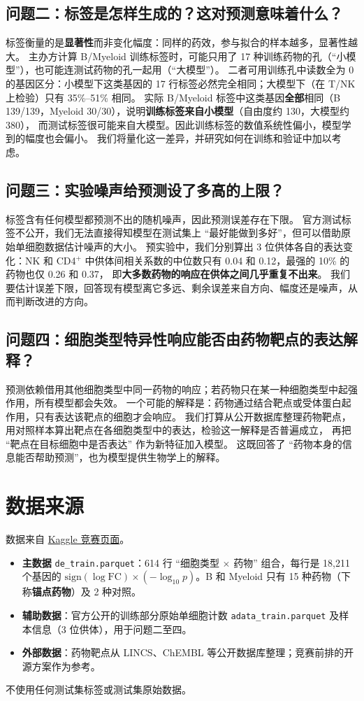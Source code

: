 \documentclass[11pt,a4paper]{article}
\begin{document}
\subsection*{问题二：标签是怎样生成的？这对预测意味着什么？}
标签衡量的是\textbf{显著性}而非变化幅度：同样的药效，参与拟合的样本越多，显著性越大。
主办方计算 B/Myeloid 训练标签时，可能只用了 17 种训练药物的孔（``小模型''），也可能连测试药物的孔一起用（``大模型''）。
二者可用训练孔中读数全为 0 的基因区分：小模型下这类基因的 17 行标签必然完全相同；大模型下（在 T/NK 上检验）只有 35\%--51\% 相同。
实际 B/Myeloid 标签中这类基因\textbf{全部}相同（B 139/139，Myeloid 30/30），说明\textbf{训练标签来自小模型}（自由度约 130，大模型约 380），
而测试标签很可能来自大模型。因此训练标签的数值系统性偏小，模型学到的幅度也会偏小。
我们将量化这一差异，并研究如何在训练和验证中加以考虑。

\subsection*{问题三：实验噪声给预测设了多高的上限？}
标签含有任何模型都预测不出的随机噪声，因此预测误差存在下限。
官方测试标签不公开，我们无法直接得知模型在测试集上 ``最好能做到多好''，但可以借助原始单细胞数据估计噪声的大小。
预实验中，我们分别算出 3 位供体各自的表达变化：NK 和 CD4$^+$ 中供体间相关系数的中位数只有 0.04 和 0.12，最强的 10\% 的药物也仅 0.26 和 0.37，
即\textbf{大多数药物的响应在供体之间几乎重复不出来}。
我们要估计误差下限，回答现有模型离它多远、剩余误差来自方向、幅度还是噪声，从而判断改进的方向。

\subsection*{问题四：细胞类型特异性响应能否由药物靶点的表达解释？}
预测依赖借用其他细胞类型中同一药物的响应；若药物只在某一种细胞类型中起强作用，所有模型都会失效。
一个可能的解释是：药物通过结合靶点或受体蛋白起作用，只有表达该靶点的细胞才会响应。
我们打算从公开数据库整理药物靶点，用对照样本算出靶点在各细胞类型中的表达，检验这一解释是否普遍成立，
再把 ``靶点在目标细胞中是否表达'' 作为新特征加入模型。
这既回答了 ``药物本身的信息能否帮助预测''，也为模型提供生物学上的解释。

\section{数据来源}

数据来自 \href{https://www.kaggle.com/competitions/open-problems-single-cell-perturbations/data}{Kaggle 竞赛页面}。
\begin{itemize}
\item \textbf{主数据} \texttt{de\_train.parquet}：614 行 ``细胞类型 $\times$ 药物'' 组合，每行是 18{,}211 个基因的
  $\text{sign}(\log\text{FC})\times(-\log_{10}p)$。B 和 Myeloid 只有 15 种药物（下称\textbf{锚点药物}）及 2 种对照。
\item \textbf{辅助数据}：官方公开的训练部分原始单细胞计数 \texttt{adata\_train.parquet} 及样本信息（3 位供体），用于问题二至四。
\item \textbf{外部数据}：药物靶点从 LINCS、ChEMBL 等公开数据库整理；竞赛前排的开源方案作为参考。
\end{itemize}
不使用任何测试集标签或测试集原始数据。
\end{document}
